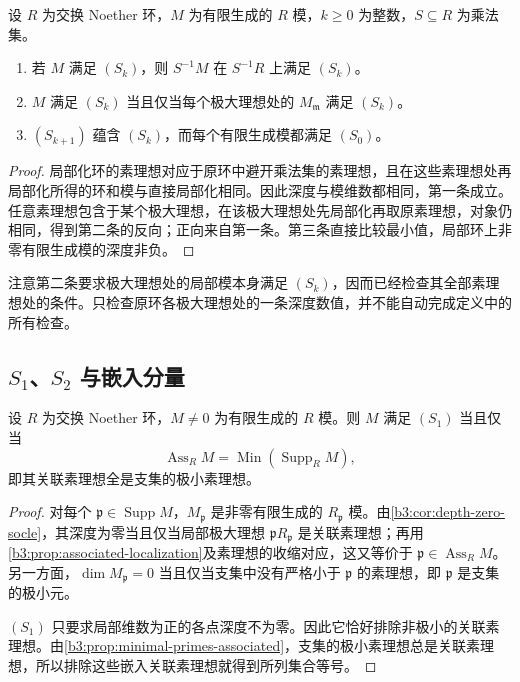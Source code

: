 \begin{proposition}\label{b3:prop:serre-localization}
	设 \(R\) 为交换 Noether 环，\(M\) 为有限生成的 \(R\) 模，\(k\ge0\) 为整数，\(S\subseteq R\) 为乘法集。
	\begin{enumerate}
		\item 若 \(M\) 满足 \((S_k)\)，则 \(S^{-1}M\) 在 \(S^{-1}R\) 上满足 \((S_k)\)。
		\item \(M\) 满足 \((S_k)\) 当且仅当每个极大理想处的 \(M_{\mathfrak m}\) 满足 \((S_k)\)。
		\item \((S_{k+1})\) 蕴含 \((S_k)\)，而每个有限生成模都满足 \((S_0)\)。
	\end{enumerate}
\end{proposition}
\begin{proof}
	局部化环的素理想对应于原环中避开乘法集的素理想，且在这些素理想处再局部化所得的环和模与直接局部化相同。因此深度与模维数都相同，第一条成立。任意素理想包含于某个极大理想，在该极大理想处先局部化再取原素理想，对象仍相同，得到第二条的反向；正向来自第一条。第三条直接比较最小值，局部环上非零有限生成模的深度非负。
\end{proof}

注意第二条要求极大理想处的局部模本身满足 \((S_k)\)，因而已经检查其全部素理想处的条件。只检查原环各极大理想处的一条深度数值，并不能自动完成定义中的所有检查。

\subsection{\texorpdfstring{\(S_1\)}{S1}、\texorpdfstring{\(S_2\)}{S2} 与嵌入分量}
\label{b3:subsec:1604:03}

\begin{theorem}\label{b3:thm:serre-s1-associated}
	设 \(R\) 为交换 Noether 环，\(M\ne0\) 为有限生成的 \(R\) 模。则 \(M\) 满足 \((S_1)\) 当且仅当
	\[
		\operatorname{Ass}_RM=\operatorname{Min}(\operatorname{Supp}_RM),
	\]
	即其关联素理想全是支集的极小素理想。
\end{theorem}
\begin{proof}
	对每个 \(\mathfrak p\in\operatorname{Supp}M\)，\(M_{\mathfrak p}\) 是非零有限生成的 \(R_{\mathfrak p}\) 模。由\cref{b3:cor:depth-zero-socle}，其深度为零当且仅当局部极大理想 \(\mathfrak pR_{\mathfrak p}\) 是关联素理想；再用\cref{b3:prop:associated-localization}及素理想的收缩对应，这又等价于 \(\mathfrak p\in\operatorname{Ass}_RM\)。另一方面，\(\dim M_{\mathfrak p}=0\) 当且仅当支集中没有严格小于 \(\mathfrak p\) 的素理想，即 \(\mathfrak p\) 是支集的极小元。

	\((S_1)\) 只要求局部维数为正的各点深度不为零。因此它恰好排除非极小的关联素理想。由\cref{b3:prop:minimal-primes-associated}，支集的极小素理想总是关联素理想，所以排除这些嵌入关联素理想就得到所列集合等号。
\end{proof}

